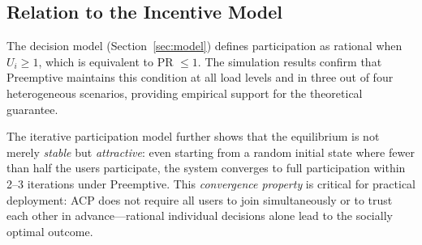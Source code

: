 
\subsection{Relation to the Incentive Model}
\label{sec:discussion_incentive}


The decision model (Section~\ref{sec:model}) defines participation as
rational when $U_i \geq 1$, which is equivalent to PR $\leq 1$.
The simulation results confirm that Preemptive maintains this condition
at all load levels and in three out of four heterogeneous scenarios,
providing empirical support for the theoretical guarantee.


The iterative participation model further shows that the equilibrium
is not merely \emph{stable} but \emph{attractive}: even starting from
a random initial state where fewer than half the users participate,
the system converges to full participation within 2--3 iterations
under Preemptive.
This \emph{convergence property} is critical for practical deployment:
ACP does not require all users to join simultaneously or to trust each
other in advance---rational individual decisions alone lead to the
socially optimal outcome.

